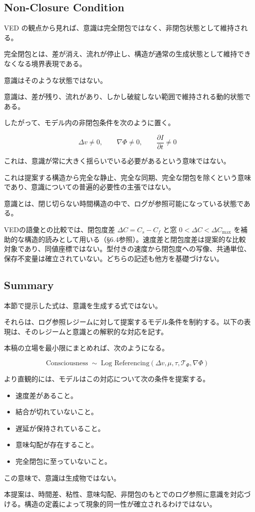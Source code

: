 \subsection{Non-Closure Condition}

VED の観点から見れば、意識は完全閉包ではなく、非閉包状態として維持される。

完全閉包とは、差が消え、流れが停止し、構造が通常の生成状態として維持できなくなる境界表現である。

意識はそのような状態ではない。

意識は、差が残り、流れがあり、しかし破綻しない範囲で維持される動的状態である。

したがって、モデル内の非閉包条件を次のように置く。

\begin{equation}
\Delta v \neq 0,
\qquad
\nabla \Phi \neq 0,
\qquad
\frac{\partial I}{\partial t} \neq 0
\end{equation}

これは、意識が常に大きく揺らいでいる必要があるという意味ではない。

これは提案する構造から完全な静止、完全な同期、完全な閉包を除くという意味であり、意識についての普遍的必要性の主張ではない。

意識とは、閉じ切らない時間構造の中で、ログが参照可能になっている状態である。

VEDの語彙との比較では、閉包度差 $\Delta C = C_s - C_f$ と窓 $0 < \Delta C < \Delta C_{\max}$ を補助的な構造的読みとして用いる（§6.4参照）。速度差と閉包度差は提案的な比較対象であり、同値座標ではない。型付きの速度から閉包度への写像、共通単位、保存不変量は確立されていない。どちらの記述も他方を基礎づけない。

\subsection{Summary}

本節で提示した式は、意識を生成する式ではない。

それらは、ログ参照レジームに対して提案するモデル条件を制約する。以下の表現は、そのレジームと意識との解釈的な対応を記す。

本稿の立場を最小限にまとめれば、次のようになる。

\begin{equation}
\text{Consciousness}
\;\sim\;
\text{Log Referencing}
\left(
\Delta v,
\mu,
\tau,
\mathcal{T}_{\Phi},
\nabla \Phi
\right)
\end{equation}

より直観的には、モデルはこの対応について次の条件を提案する。

\begin{itemize}
\item 速度差があること。
\item 結合が切れていないこと。
\item 遅延が保持されていること。
\item 意味勾配が存在すること。
\item 完全閉包に至っていないこと。
\end{itemize}

この意味で、意識は生成物ではない。

本提案は、時間差、粘性、意味勾配、非閉包のもとでのログ参照に意識を対応づける。構造の定義によって現象的同一性が確立されるわけではない。
